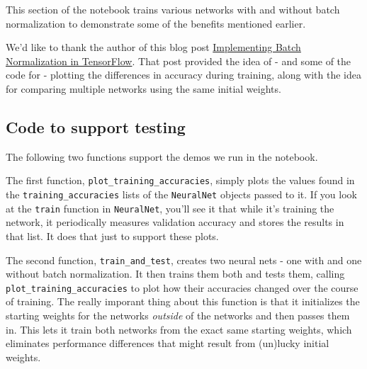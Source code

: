 \documentclass[11pt]{article}
\begin{document}
This section of the notebook trains various networks with and without
batch normalization to demonstrate some of the benefits mentioned
earlier.

We'd like to thank the author of this blog post
\href{http://r2rt.com/implementing-batch-normalization-in-tensorflow.html}{Implementing
Batch Normalization in TensorFlow}. That post provided the idea of - and
some of the code for - plotting the differences in accuracy during
training, along with the idea for comparing multiple networks using the
same initial weights.

    \hypertarget{code-to-support-testing}{%
\subsection{Code to support testing}\label{code-to-support-testing}}

The following two functions support the demos we run in the notebook.

The first function, \texttt{plot\_training\_accuracies}, simply plots
the values found in the \texttt{training\_accuracies} lists of the
\texttt{NeuralNet} objects passed to it. If you look at the
\texttt{train} function in \texttt{NeuralNet}, you'll see it that while
it's training the network, it periodically measures validation accuracy
and stores the results in that list. It does that just to support these
plots.

The second function, \texttt{train\_and\_test}, creates two neural nets
- one with and one without batch normalization. It then trains them both
and tests them, calling \texttt{plot\_training\_accuracies} to plot how
their accuracies changed over the course of training. The really
imporant thing about this function is that it initializes the starting
weights for the networks \emph{outside} of the networks and then passes
them in. This lets it train both networks from the exact same starting
weights, which eliminates performance differences that might result from
(un)lucky initial weights.
\end{document}
